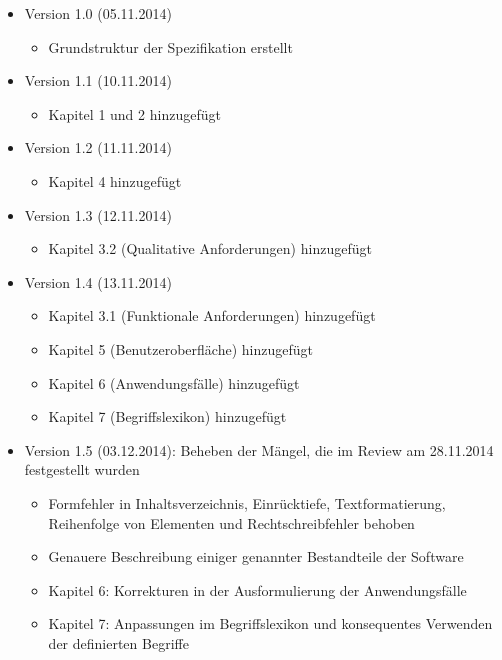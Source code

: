 \documentclass[11pt]{article}
\begin{document}
\begin{itemize}
	\item Version 1.0 (05.11.2014)
	\begin{itemize}
		\item Grundstruktur der Spezifikation erstellt
	\end{itemize}
	\item Version 1.1 (10.11.2014)
	\begin{itemize}
		\item Kapitel 1 und 2 hinzugefügt
	\end{itemize}
	\item Version 1.2 (11.11.2014)
	\begin{itemize}	
		\item Kapitel 4 hinzugefügt
	\end{itemize}
	\item Version 1.3 (12.11.2014)
	\begin{itemize}
		\item Kapitel 3.2 (Qualitative Anforderungen) hinzugefügt
	\end{itemize}
	\item Version 1.4 (13.11.2014)
	\begin{itemize}
		\item Kapitel 3.1 (Funktionale Anforderungen) hinzugefügt
		\item Kapitel 5 (Benutzeroberfläche) hinzugefügt
		\item Kapitel 6 (Anwendungsfälle) hinzugefügt
		\item Kapitel 7 (Begriffslexikon) hinzugefügt
	\end{itemize}
	\item Version 1.5 (03.12.2014): Beheben der Mängel, die im Review am 28.11.2014 festgestellt wurden
	\begin{itemize}
		\item Formfehler in Inhaltsverzeichnis, Einrücktiefe, Textformatierung, Reihenfolge von Elementen und Rechtschreibfehler behoben
		\item Genauere Beschreibung einiger genannter Bestandteile der Software
		\item Kapitel 6: Korrekturen in der Ausformulierung der Anwendungsfälle
		\item Kapitel 7: Anpassungen im Begriffslexikon und konsequentes Verwenden der definierten Begriffe
	\end{itemize}
\end{itemize}
\end{document}
